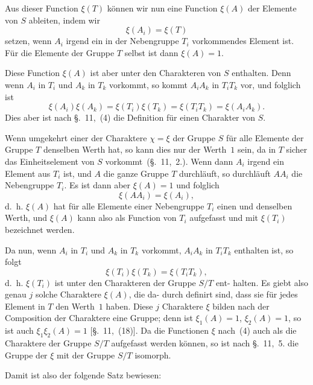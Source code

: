 \documentclass[12pt,a4paper]{article}
\theoremstyle{plain}
\theoremstyle{definition}
\theoremstyle{remark}
\begin{document}
Aus dieser Function $\xi(T)$ können wir nun eine Function $\xi(A)$
der Elemente von $S$ ableiten, indem wir
\begin{equation}\tag{3}
\xi(A_i) = \xi(T)
\end{equation}
setzen, wenn $A_i$ irgend ein in der Nebengruppe $T_i$ vorkommendes
Element ist. Für die Elemente der Gruppe $T$ selbst ist dann
$\xi(A) = 1$.

Diese Function $\xi(A)$ ist aber unter den Charakteren von $S$
enthalten. Denn wenn $A_i$ in $T_i$ und $A_k$ in $T_k$ vorkommt, so
kommt $A_i A_k$ in $T_i T_k$ vor, und folglich ist
\begin{equation}\tag{4}
\xi(A_i) \xi(A_k) = \xi(T_i) \xi(T_k) = \xi(T_i T_k) = \xi(A_i A_k).
\end{equation}
Dies aber ist nach \S.~11,~(4) die Definition für einen Charakter
von $S$.

Wenn umgekehrt einer der Charaktere $\chi = \xi$ der Gruppe $S$
für alle Elemente der Gruppe $T$ denselben Werth hat, so kann
dies nur der Werth~$1$ sein, da in $T$ sicher das Einheitselement
von $S$ vorkommt~(\S.~11,~2.). Wenn dann $A_i$ irgend ein Element
aus $T_i$ ist, und $A$ die ganze Gruppe $T$ durchläuft, so durchläuft
$AA_i$ die Nebengruppe $T_i$. Es ist dann aber $\xi(A) = 1$ und
folglich
\begin{equation}\tag{5}
\xi(AA_i) = \xi(A_i),
\end{equation}
d.~h. $\xi(A)$ hat für alle Elemente einer Nebengruppe $T_i$ einen
und denselben Werth, und $\xi(A)$ kann also als Function von $T_i$
aufgefasst und mit $\xi(T_i)$ bezeichnet werden.

Da nun, wenn $A_i$ in $T_i$ und $A_k$ in $T_k$ vorkommt, $A_i A_k$ in
$T_i T_k$ enthalten ist, so folgt
\begin{equation}\tag{6}
\xi(T_i) \xi(T_k) = \xi(T_i T_k),
\end{equation}
d.~h. $\xi(T_i)$ ist unter den Charakteren der Gruppe $S/T$ ent-
halten. Es giebt also genau $j$ solche Charaktere $\xi(A)$, die da-
durch definirt sind, dass sie für jedes Element in $T$ den Werth~$1$
haben. Diese $j$ Charaktere $\xi$ bilden nach der Composition der
Charaktere eine Gruppe; denn ist $\xi_1(A) = 1$, $\xi_2(A) = 1$, so ist
auch $\xi_1 \xi_2(A) = 1$ [\S.~11,~(18)]. Da die Functionen $\xi$ nach~(4)
auch als die Charaktere der Gruppe $S/T$ aufgefasst werden
können, so ist nach \S.~11,~5. die Gruppe der $\xi$ mit der Gruppe
$S/T$ isomorph.

Damit ist also der folgende Satz bewiesen:
\end{document}
